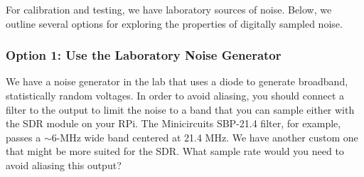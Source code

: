 \documentclass[11pt,preprint]{aastex}
\begin{document}
For calibration and testing, we have laboratory sources of noise. Below, we outline
several options for exploring
the properties of digitally sampled noise.

\subsubsection{Option 1: Use the Laboratory Noise Generator}

\noindent
We have a noise generator in the lab that uses a diode to generate broadband,
statistically random voltages. In order to avoid aliasing, you should connect
a filter to the output to limit the noise to a band that you can sample either
with the SDR module on your RPi. The 
Minicircuits SBP-21.4 filter, for example, passes a $\sim 6$-MHz wide band centered
at 21.4 MHz. We have another custom one that might be more suited for the SDR.
What sample rate would you need to avoid aliasing this output? 
\end{document}
